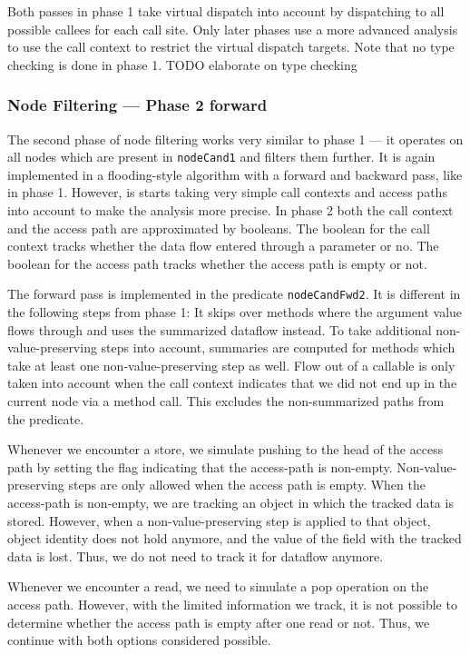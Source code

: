Both passes in phase 1 take virtual dispatch into account by dispatching to all possible callees
for each call site. Only later phases use a more advanced analysis to use the call context 
to restrict the virtual dispatch targets.
Note that no type checking is done in phase 1.
TODO elaborate on type checking

\subsubsection*{Node Filtering --- Phase 2 forward}
The second phase of node filtering works very similar to phase 1 --- it 
operates on all nodes which are present in \texttt{nodeCand1} and filters them further.
It is again implemented in a flooding-style algorithm with a forward and backward 
pass, like in phase 1.
However, is starts taking very simple call contexts and access paths 
into account to make the analysis more precise.
In phase 2 both the call context and the access path are approximated by booleans.
The boolean for the call context tracks whether the data flow entered through 
a parameter or no.
The boolean for the access path tracks whether the access path is empty or not.


The forward pass is implemented in the predicate \texttt{nodeCandFwd2}.
It is different in the following steps from phase 1:
It skips over methods where the argument value 
flows through and uses the summarized dataflow instead.
To take additional non-value-preserving steps into account,
summaries are computed for methods which take at least one
non-value-preserving step as well.
Flow out of a callable is only taken into account when the call context 
indicates that we did not end up in the current node via a method call.
This excludes the non-summarized paths from the predicate.

Whenever we encounter a store, we simulate pushing to the head of the access path 
by setting the flag indicating that the access-path is non-empty.
Non-value-preserving steps are only allowed when the access path is empty.
When the access-path is non-empty, we are tracking an object in which the tracked 
data is stored. However, when a non-value-preserving step is applied to that object,
object identity does not hold anymore, and the value of the field with the tracked
data is lost.
Thus, we do not need to track it for dataflow anymore.

Whenever we encounter a read, we need to simulate a pop operation on the access path.
However, with the limited information we track, it is not possible to determine 
whether the access path is empty after one read or not.
Thus, we continue with both options considered possible.

